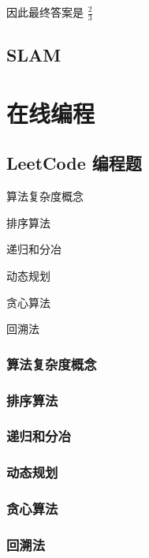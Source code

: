 \documentclass[cn,10pt,math=newtx,citestyle=gb7714-2015,bibstyle=gb7714-2015]{elegantbook}
\begin{document}
因此最终答案是 $\frac{2}{3}$


\newpage


\section{SLAM}

\chapter{在线编程}

\section{LeetCode 编程题}

\begin{introduction}
\item 算法复杂度概念
\item 排序算法
\item 递归和分冶
\item 动态规划
\item 贪心算法
\item 回溯法
\end{introduction}

\subsection{算法复杂度概念}

\subsection{排序算法}

\subsection{递归和分冶}

\subsection{动态规划}

\subsection{贪心算法}

\subsection{回溯法}
\end{document}
